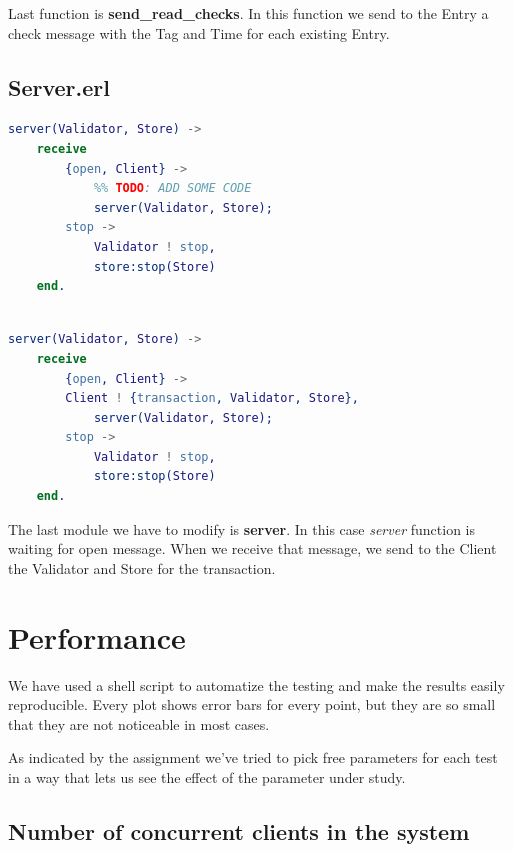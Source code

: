 \documentclass[a4paper, 10pt]{article}
\begin{document}
Last function is \textbf{send\_read\_checks}. In this function we send to the Entry a check message with the Tag and Time for each existing Entry.

\clearpage

\subsection{Server.erl}

\begin{minipage}{.45\textwidth}
	\begin{lstlisting}[language=erlang, caption={Template}]
server(Validator, Store) ->
    receive 
        {open, Client} ->
            %% TODO: ADD SOME CODE
            server(Validator, Store);
        stop ->
            Validator ! stop,
            store:stop(Store)
    end.
 	\end{lstlisting}
    \end{minipage}\hfill
    \begin{minipage}{.45\textwidth}
	\begin{lstlisting}[language=erlang, caption={Filled version}]

server(Validator, Store) ->
    receive 
        {open, Client} ->
	    Client ! {transaction, Validator, Store},
            server(Validator, Store);
        stop ->
            Validator ! stop,
            store:stop(Store)
    end.
  	\end{lstlisting}
  \end{minipage}

  The last module we have to modify is \textbf{server}. In this case \textit{server} function is waiting for open message. When we receive that message, we send to the Client the Validator and Store for the transaction.

\clearpage
\section{Performance}

We have used a shell script to automatize the testing and make the results easily reproducible. Every plot shows error bars for every point, but they are so small that they are not noticeable in most cases.

As indicated by the assignment we've tried to pick free parameters for each test in a way that lets us see the effect of the parameter under study. 

\subsection{Number of concurrent clients in the system}
\label{sec:numclients}
\end{document}
